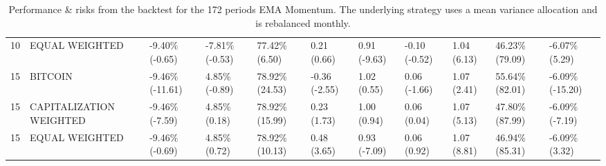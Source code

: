 \documentclass{article}
\begin{document}
\begin{landscape}
\begin{table}[H]
\begin{tabular}{p{0.4cm}|p{3cm}|p{1.65cm}|p{1.65cm}|p{1.65cm}|p{1.65cm}|p{1.65cm}|p{1.65cm}|p{1.65cm}|p{1.65cm}|p{1.65cm}}
\\ 
10&EQUAL WEIGHTED&-9.40\% (-0.65)&-7.81\% (-0.53)&77.42\% (6.50)&0.21 (0.66)&0.91 (-9.63)&-0.10 (-0.52)&1.04 (6.13)&46.23\% (79.09)&-6.07\% (5.29)
\\ 
15&BITCOIN&-9.46\% (-11.61)&4.85\% (-0.89)&78.92\% (24.53)&-0.36 (-2.55)&1.02 (0.55)&0.06 (-1.66)&1.07 (2.41)&55.64\% (82.01)&-6.09\% (-15.20)
\\ 
15&CAPITALIZATION WEIGHTED&-9.46\% (-7.59)&4.85\% (0.18)&78.92\% (15.99)&0.23 (1.73)&1.00 (0.94)&0.06 (0.04)&1.07 (5.13)&47.80\% (87.99)&-6.09\% (-7.19)
\\ 
15&EQUAL WEIGHTED&-9.46\% (-0.69)&4.85\% (0.72)&78.92\% (10.13)&0.48 (3.65)&0.93 (-7.09)&0.06 (0.92)&1.07 (8.81)&46.94\% (85.31)&-6.09\% (3.32)
\\ 
    \bottomrule
  \end{tabular}
  \label{tab:emamom172meanvar}
   \caption{Performance \& risks from the backtest for the 172 periods EMA Momentum. The underlying strategy uses a mean variance allocation and is rebalanced monthly.}
\end{table}
\end{landscape}
\end{document}
